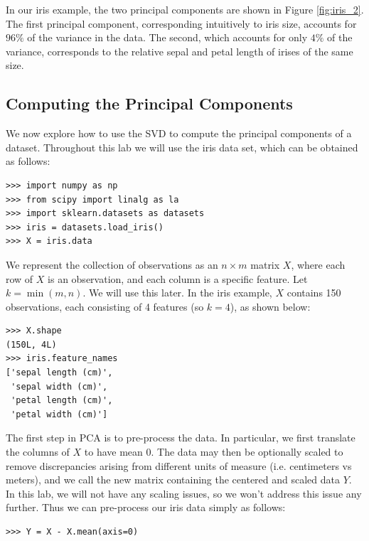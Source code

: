 In our iris example, the two principal components are shown in Figure \ref{fig:iris_2}. The first principal component, corresponding intuitively to iris size, accounts for $96\%$ of the variance in the data. The second, which accounts for only $4\%$ of the variance, corresponds to the relative sepal and petal length of irises of the same size.

\subsection*{Computing the Principal Components}
We now explore how to use the SVD to compute the principal components of a dataset.
Throughout this lab we will use the  iris data set, which can be obtained as follows:
\begin{lstlisting}
>>> import numpy as np
>>> from scipy import linalg as la
>>> import sklearn.datasets as datasets
>>> iris = datasets.load_iris()
>>> X = iris.data
\end{lstlisting}
We represent the collection of observations as an $n \times m$ matrix $X$, where each row of $X$ is an observation, and each column is a specific feature.
Let $k = \min(m,n)$.  We will use this later.
In the iris example, $X$ contains 150 observations, each consisting of 4 features (so $k = 4$), as shown below:
\begin{lstlisting}
>>> X.shape
(150L, 4L)
>>> iris.feature_names
['sepal length (cm)',
 'sepal width (cm)',
 'petal length (cm)',
 'petal width (cm)']
\end{lstlisting}

The first step in PCA is to pre-process the data. In particular, we first translate the columns of $X$ to have mean 0.
The data may then be optionally scaled to remove discrepancies arising from different units of measure (i.e. centimeters vs meters), and we call the new matrix containing the centered and scaled data $Y$.
In this lab, we will not have any scaling issues, so we won't address this issue any further.
Thus we can pre-process our iris data simply as follows:
\begin{lstlisting}
>>> Y = X - X.mean(axis=0)
\end{lstlisting}

